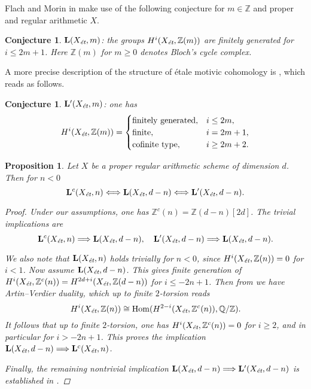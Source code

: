 \documentclass[leqno,12pt]{article}
\theoremstyle{plain}
\newtheorem{proposition}[theorem]{\indent\sc Proposition}
\newtheorem{conjecture}[theorem]{\indent\sc Conjecture}
\theoremstyle{definition}
\DeclareMathOperator{\Hom}{Hom}
\newcommand{\QQ}{\mathbb{Q}}
\newcommand{\ZZ}{\mathbb{Z}}
\newcommand{\et}{\text{\it \'{e}t}}
\begin{document}
\vspace{1em}

Flach and Morin in \cite{Flach-Morin-2018} make use of the following conjecture
for $m \in \ZZ$ and proper and regular arithmetic $X$.

\begin{conjecture}
  $\mathbf{L} (X_\et, m)$: the groups $H^i (X_\et, \ZZ (m))$ are finitely
  generated for $i \le 2m+1$. Here $\ZZ (m)$ for $m \ge 0$ denotes Bloch's cycle
  complex.
\end{conjecture}

A more precise description of the structure of \'{e}tale motivic cohomology is
\cite[Conjecture~4.12]{Geisser-2017}, which reads as follows.

\begin{conjecture}
  $\mathbf{L}' (X_\et, m)$: one has
  \[ H^i (X_\et, \ZZ (m)) = \begin{cases}
      \text{finitely generated}, & i \le 2m, \\
      \text{finite}, & i = 2m + 1, \\
      \text{cofinite type}, & i \ge 2m + 2.
    \end{cases} \]
\end{conjecture}

\begin{proposition}
  \label{prop:Lc-Xet-n-vs-L-Xet-d-n}
  Let $X$ be a proper regular arithmetic scheme of dimension $d$.
  Then for $n < 0$
  \[ \mathbf{L}^c (X_\et, n) \Longleftrightarrow
    \mathbf{L} (X_\et, d-n) \Longleftrightarrow
    \mathbf{L}' (X_\et, d-n). \]

  \begin{proof}
    Under our assumptions, one has $\ZZ^c (n) = \ZZ (d-n) [2d]$. The trivial
    implications are
    \[ \mathbf{L}^c (X_\et, n) \Longrightarrow \mathbf{L} (X_\et, d-n), \quad
      \mathbf{L}' (X_\et, d-n) \Longrightarrow \mathbf{L} (X_\et, d-n). \]

    We also note that $\mathbf{L} (X_\et, n)$ holds trivially for $n < 0$, since
    $H^i (X_\et, \ZZ (n)) = 0$ for $i < 1$.
    Now assume $\mathbf{L} (X_\et, d-n)$. This gives finite generation of
    $H^i (X_\et, \ZZ^c (n)) = H^{2d+i} (X_\et, \ZZ (d-n))$ for $i \le -2n + 1$.
    Then from \cite[Proposition~3.4]{Flach-Morin-2018} we have Artin--Verdier
    duality, which up to finite $2$-torsion reads
    $$H^i (X_\et, \ZZ (n)) \cong \Hom (H^{2-i} (X_\et, \ZZ^c (n)), \QQ/\ZZ).$$
    It follows that up to finite $2$-torsion, one has
    $H^i (X_\et, \ZZ^c (n)) = 0$ for $i \ge 2$, and in particular for
    $i > -2n + 1$. This proves the implication
    $\mathbf{L} (X_\et, d-n) \Longrightarrow \mathbf{L}^c (X_\et, n)$.

    Finally, the remaining nontrivial implication
    $\mathbf{L} (X_\et, d-n) \Longrightarrow \mathbf{L}' (X_\et, d-n)$ is
    established in \cite[Proposition~3.4]{Flach-Morin-2018}.
  \end{proof}
\end{proposition}
\end{document}
